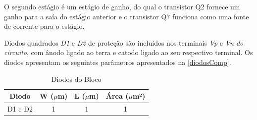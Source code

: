 O segundo est\'agio \'e um est\'agio de ganho, do qual o transistor Q2 fornece um ganho para a saía do est\'agio anterior e o transistor Q7 funciona como uma fonte de corrente para o est\'agio.

Diodos quadrados \textit{D1} e \textit{D2} de proteção são inclu\'idos nos terminais \textit{Vp} e \textit{Vn do circuito}, com \^anodo ligado ao terra e catodo ligado ao seu respectivo terminal. Os diodos apresentam os seguintes par\^ametros apresentados na \autoref{diodosComp}.

\begin{table}[htbp]
\caption{Diodos do Bloco \NomeBloco}
\label{diodosComp}
\centering
\begin{tabular}{cccc}
\toprule
Diodo & W ($\mu$m)  & L ($\mu$m)           & \'Area ($\mu$m²)\\
\midrule \midrule
D1 e D2 & 1 & 1 & 1 \\

\bottomrule
\end{tabular}
\end{table}
